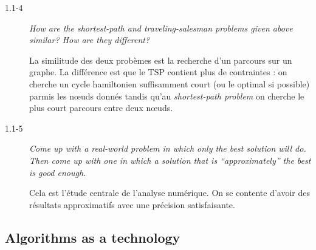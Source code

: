 \begin{description}
\begin{exrev}
    \end{exrev}

  \item[1.1-4] {\itshape How are the shortest-path and traveling-salesman problems given above similar? How are they different?}

    \begin{ex}
      La similitude des deux prob\`emes est la recherche d'un parcours sur un graphe. La diff\'erence est que le TSP contient plus       de contraintes : on cherche un cycle hamiltonien suffisamment court (ou le optimal si possible) parmis les n\oe uds donn\'es tandis qu'au {\it shortest-path problem} on cherche le plus court parcours entre deux n\oe uds. \mbox{}
    \end{ex}

  \item[1.1-5] {\itshape Come up with a real-world problem in which only the best solution will do. Then come up with one in which a solution that is “approximately” the best is good enough.}

    \begin{ex}
      Cela est l'\'etude centrale de l'analyse num\'erique. On se contente d'avoir des r\'esultats approximatifs avec une pr\'ecision satisfaisante.
    \end{ex}

\end{description}

\subsection{Algorithms as a technology}

